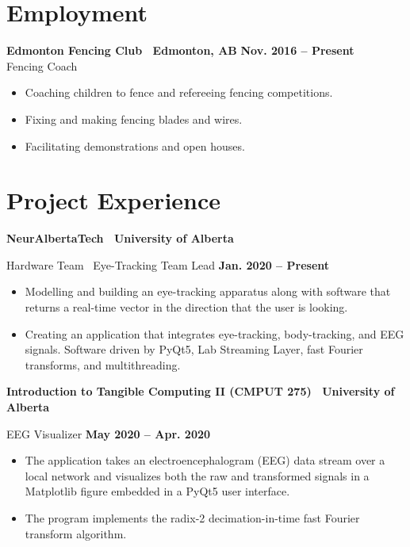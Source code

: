 \documentclass{article}
\begin{document}
\section*{Employment}
    \textbf{Edmonton Fencing Club \textbar\ Edmonton, AB} \hfill \textbf{Nov. 2016 -- Present}\\
    Fencing  Coach \vspace{-0.5em}
    \begin{itemize}
        \item Coaching children to fence and refereeing fencing competitions.
        \item Fixing and making fencing blades and wires.
        \item Facilitating demonstrations and open houses.
    \end{itemize}


\section*{Project Experience}
    \textbf{NeurAlbertaTech \textbar\ University of Alberta}

    Hardware Team \textbar\ Eye-Tracking Team Lead \hfill \textbf{Jan. 2020 -- Present}
    \begin{itemize}
        \item Modelling and building an eye-tracking apparatus along with software that returns a real-time vector in the direction that the user is looking.
        \item Creating an application that integrates eye-tracking, body-tracking, and EEG signals. Software driven by PyQt5, Lab Streaming Layer, fast Fourier transforms, and multithreading.
    \end{itemize}

    \textbf{Introduction to Tangible Computing II (CMPUT 275) \textbar\ University of Alberta}

    EEG Visualizer \hfill \textbf{May 2020 -- Apr. 2020}
    \begin{itemize}
        \item The application takes an electroencephalogram (EEG) data stream over a local network and visualizes both the raw and transformed signals in a Matplotlib figure embedded in a PyQt5 user interface.
        \item The program implements the radix-2 decimation-in-time fast Fourier transform algorithm.
    \end{itemize}
\end{document}
